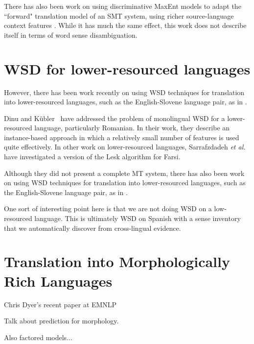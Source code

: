 There has also been work on using discriminative MaxEnt models to adapt
the ``forward" translation model of an SMT system, using richer
source-language context features \cite{vzabokrtsky-popel-marevcek:2010:WMT}.
While it has much the same effect, this work does not describe itself in terms
of word sense disambiguation.




\section{WSD for lower-resourced languages}
However, there has been work recently on using WSD techniques for translation
into lower-resourced languages, such as the English-Slovene language pair, as
in \cite{vintar-fivser-vrvsvcaj:2012:ESIRMT-HyTra2012}. 

Dinu and Kübler~\cite{Dinu07} have addressed the problem of monolingual WSD for
a lower-resourced language, particularly Romanian. In their work, they describe
an instance-based approach in which a relatively small number of features is
used quite effectively. In other work on lower-resourced languages,
Sarrafzdadeh \textit{et al.} have investigated a version of the Lesk algorithm
for Farsi.

Although they did not present a complete MT system, there has also been work
on using WSD techniques for translation into lower-resourced languages, such as
the English-Slovene language pair, as in
\cite{vintar-fivser-vrvsvcaj:2012:ESIRMT-HyTra2012}. 

One sort of interesting point here is that we are not doing WSD on a
low-resourced language. This is ultimately WSD on Spanish with a sense
inventory that we automatically discover from cross-lingual evidence.


\section{Translation into Morphologically Rich Languages}
Chris Dyer's recent paper at EMNLP
\cite{chahuneau:2013:emnlp}

Talk about prediction for morphology.
\cite{toutanova-suzuki-ruopp:2008:ACLMain}

Also factored models...
\cite{yeniterzi-oflazer:2010:ACL}
